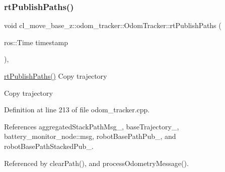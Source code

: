 \subsubsection{\texorpdfstring{rt\+Publish\+Paths()}{rtPublishPaths()}}
{\footnotesize\ttfamily void cl\+\_\+move\+\_\+base\+\_\+z\+::odom\+\_\+tracker\+::\+Odom\+Tracker\+::rt\+Publish\+Paths (\begin{DoxyParamCaption}\item[{ros\+::\+Time}]{timestamp }\end{DoxyParamCaption})\hspace{0.3cm}{\ttfamily [protected]}, {\ttfamily [virtual]}}

\hyperlink{classcl__move__base__z_1_1odom__tracker_1_1OdomTracker_a8f728f85d1f3f49f4b94e37052a59d6d}{rt\+Publish\+Paths()} Copy trajectory

Copy trajectory 

Definition at line 213 of file odom\+\_\+tracker.\+cpp.



References aggregated\+Stack\+Path\+Msg\+\_\+, base\+Trajectory\+\_\+, battery\+\_\+monitor\+\_\+node\+::msg, robot\+Base\+Path\+Pub\+\_\+, and robot\+Base\+Path\+Stacked\+Pub\+\_\+.



Referenced by clear\+Path(), and process\+Odometry\+Message().


